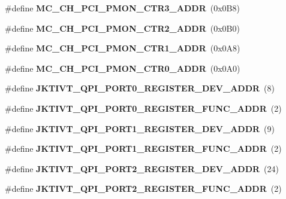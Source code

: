 \begin{DoxyCompactItemize}
\item 
\#define {\bfseries M\+C\+\_\+\+C\+H\+\_\+\+P\+C\+I\+\_\+\+P\+M\+O\+N\+\_\+\+C\+T\+R3\+\_\+\+A\+D\+DR}~(0x0\+B8)\label{types_8h_a9bc0da0ea219da7342758080e2b2b923}

\item 
\#define {\bfseries M\+C\+\_\+\+C\+H\+\_\+\+P\+C\+I\+\_\+\+P\+M\+O\+N\+\_\+\+C\+T\+R2\+\_\+\+A\+D\+DR}~(0x0\+B0)\label{types_8h_ac3febfd1f0b8c18039b82c218830cef4}

\item 
\#define {\bfseries M\+C\+\_\+\+C\+H\+\_\+\+P\+C\+I\+\_\+\+P\+M\+O\+N\+\_\+\+C\+T\+R1\+\_\+\+A\+D\+DR}~(0x0\+A8)\label{types_8h_a543a917251e68c9b645ad13bcba71efa}

\item 
\#define {\bfseries M\+C\+\_\+\+C\+H\+\_\+\+P\+C\+I\+\_\+\+P\+M\+O\+N\+\_\+\+C\+T\+R0\+\_\+\+A\+D\+DR}~(0x0\+A0)\label{types_8h_aade8692522b0bb5c8f271af605b2043a}

\item 
\#define {\bfseries J\+K\+T\+I\+V\+T\+\_\+\+Q\+P\+I\+\_\+\+P\+O\+R\+T0\+\_\+\+R\+E\+G\+I\+S\+T\+E\+R\+\_\+\+D\+E\+V\+\_\+\+A\+D\+DR}~(8)\label{types_8h_a624a8b9595c387aae5603f38edf2e3fd}

\item 
\#define {\bfseries J\+K\+T\+I\+V\+T\+\_\+\+Q\+P\+I\+\_\+\+P\+O\+R\+T0\+\_\+\+R\+E\+G\+I\+S\+T\+E\+R\+\_\+\+F\+U\+N\+C\+\_\+\+A\+D\+DR}~(2)\label{types_8h_ae7ea5cfb57b8685a1c7d448f47aade95}

\item 
\#define {\bfseries J\+K\+T\+I\+V\+T\+\_\+\+Q\+P\+I\+\_\+\+P\+O\+R\+T1\+\_\+\+R\+E\+G\+I\+S\+T\+E\+R\+\_\+\+D\+E\+V\+\_\+\+A\+D\+DR}~(9)\label{types_8h_ae6e90624a2ad5e3a2296316203f12671}

\item 
\#define {\bfseries J\+K\+T\+I\+V\+T\+\_\+\+Q\+P\+I\+\_\+\+P\+O\+R\+T1\+\_\+\+R\+E\+G\+I\+S\+T\+E\+R\+\_\+\+F\+U\+N\+C\+\_\+\+A\+D\+DR}~(2)\label{types_8h_a2a6e1278034cce4c46e0aa4c004fae91}

\item 
\#define {\bfseries J\+K\+T\+I\+V\+T\+\_\+\+Q\+P\+I\+\_\+\+P\+O\+R\+T2\+\_\+\+R\+E\+G\+I\+S\+T\+E\+R\+\_\+\+D\+E\+V\+\_\+\+A\+D\+DR}~(24)\label{types_8h_a492f6579fb2b49601c727370b8706cc4}

\item 
\#define {\bfseries J\+K\+T\+I\+V\+T\+\_\+\+Q\+P\+I\+\_\+\+P\+O\+R\+T2\+\_\+\+R\+E\+G\+I\+S\+T\+E\+R\+\_\+\+F\+U\+N\+C\+\_\+\+A\+D\+DR}~(2)\label{types_8h_a41efaa0371b8712857bb66a318bdfd12}


\end{DoxyCompactItemize}
